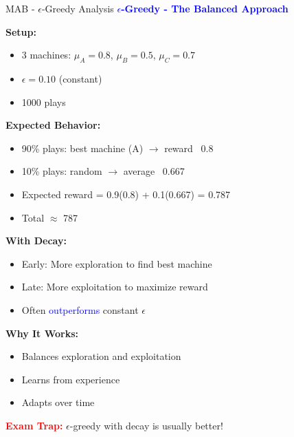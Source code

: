 \documentclass[8pt]{beamer}
\begin{document}
	\begin{frame}{MAB - $\epsilon$-Greedy Analysis}
		\fontsize{6.5}{7.5}\selectfont
		\textcolor{blue}{\textbf{$\epsilon$-Greedy - The Balanced Approach}}
		
		\textbf{Setup:}
		\begin{itemize}
			\item 3 machines: $\mu_A = 0.8$, $\mu_B = 0.5$, $\mu_C = 0.7$
			\item $\epsilon = 0.10$ (constant)
			\item 1000 plays
		\end{itemize}
		
		\textbf{Expected Behavior:}
		\begin{itemize}
			\item 90\% plays: best machine (A) $\rightarrow$ reward ~0.8
			\item 10\% plays: random $\rightarrow$ average ~0.667
			\item Expected reward = 0.9(0.8) + 0.1(0.667) = 0.787
			\item Total $\approx$ 787
		\end{itemize}
		
		\textbf{With Decay:}
		\begin{itemize}
			\item Early: More exploration to find best machine
			\item Late: More exploitation to maximize reward
			\item Often \textcolor{blue}{outperforms} constant $\epsilon$
		\end{itemize}
		
		\textbf{Why It Works:}
		\begin{itemize}
			\item Balances exploration and exploitation
			\item Learns from experience
			\item Adapts over time
		\end{itemize}
		
		\textcolor{red}{\textbf{Exam Trap:}} $\epsilon$-greedy with decay is usually better!
	\end{frame}
	
\end{document}
